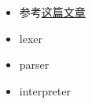 
\begin{issues}
\issueDraft
\end{issues}

\begin{itemize}
\item 参考\href{https://www.toptal.com/scala/writing-an-interpreter}{这篇文章}
\item lexer
\item parser
\item interpreter
\end{itemize}
